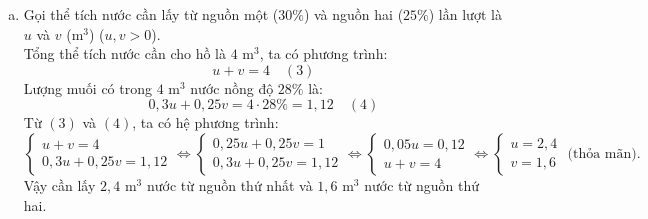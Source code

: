 \begin{bt}
{\begin{enumerate}[a)]
		Vậy nồng độ mặn của nguồn thứ nhất là $30\%$ và nguồn thứ hai là $25\%$.
		\item Gọi thể tích nước cần lấy từ nguồn một ($30\%$) và nguồn hai ($25\%$) lần lượt là $u$ và $v$ ($\text{m}^3$) ($u, v > 0$).\\
		Tổng thể tích nước cần cho hồ là $4\text{ m}^3$, ta có phương trình:
		$$u + v = 4 \quad (3)$$
		Lượng muối có trong $4\text{ m}^3$ nước nồng độ $28\%$ là:
		$$0{,}3u + 0{,}25v = 4 \cdot 28\% = 1{,}12 \quad (4)$$
		Từ $(3)$ và $(4)$, ta có hệ phương trình:
		$$\begin{cases} u + v = 4 \\ 0{,}3u + 0{,}25v = 1{,}12 \end{cases} \iff \begin{cases} 0{,}25u + 0{,}25v = 1 \\ 0{,}3u + 0{,}25v = 1{,}12 \end{cases} \iff \begin{cases} 0{,}05u = 0{,}12 \\ u + v = 4 \end{cases} \iff \begin{cases} u = 2{,}4 \\ v = 1{,}6 \end{cases}\text{ (thỏa mãn).}$$
		Vậy cần lấy $2{,}4\text{ m}^3$ nước từ nguồn thứ nhất và $1{,}6\text{ m}^3$ nước từ nguồn thứ hai.
	\end{enumerate}
}
\end{bt}


